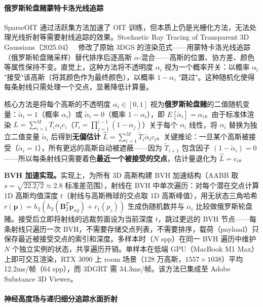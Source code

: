 \paragraph{俄罗斯轮盘赌蒙特卡洛光线追踪}

SparseOIT 通过活跃集方法加速了 OIT 训练，但本质上仍是光栅化方法，无法处理光线折射等需要射线追踪的效果。Stochastic Ray Tracing of Transparent 3D Gaussians（2025.04）~\cite{2504_06598} 修改了原始 3DGS 的渲染范式——用蒙特卡洛光线追踪（俄罗斯轮盘赌采样）替代排序后逐高斯 $\alpha$-混合——高斯的位置、协方差、颜色等属性保持不变。直觉上，这种方法将不透明度 $\alpha_i$ 视为一个概率开关：以概率 $\alpha_i$ "接受"该高斯（将其颜色作为最终颜色），以概率 $1-\alpha_i$ "跳过"。这种随机化使得每条射线只需处理一个交点，显著降低计算量。

核心方法是将每个高斯的不透明度 $\alpha_i \in [0,1]$ 视为\textbf{俄罗斯轮盘赌}的二值随机变量：$\tilde{\alpha}_i = 1$（概率 $\alpha_i$）或 $\tilde{\alpha}_i = 0$（概率 $1-\alpha_i$），即 $E[\tilde{\alpha}_i] = \alpha_i$。由于标准体渲染 $L = \sum_{i=1}^M T_i \alpha_i c_i$（$T_i = \prod_{j=1}^{i-1}(1-\alpha_j)$）关于每个 $\alpha_i$ 线性，将 $\alpha_i$ 替换为独立二值变量 $\tilde{\alpha}_i$ 后得到\textbf{无偏估计} $\hat{L} = \sum_{i=1}^M \tilde{T}_i \tilde{\alpha}_i c_i$。关键推论：一旦某个高斯被接受（$\tilde{\alpha}_i=1$），所有更远的高斯自动被遮蔽——因为 $\tilde{T}_{i+1}$ 包含因子 $(1-\tilde{\alpha}_i)=0$——所以每条射线只需要着色\textbf{最近一个被接受的交点}，估计量退化为 $\hat{L} = c_i$。

\textbf{BVH 加速实现。}实现上，为所有 3D 高斯构建 BVH 加速结构（AABB 取 $s = \sqrt{22.2/2} \approx 2.8$ 标准差范围），射线在 BVH 中单次遍历：对每个潜在交点计算 1D 高斯均值深度 $t$（射线与高斯椭球的交点取 1D 高斯峰值），用无状态三角哈希 $r(\mathbf{p}) = h_2(h_2(\mathbf{B}_2^T\mathbf{p}_{xy}) + r_1(p_z))$ 生成伪随机数并与 $\alpha_i$ 比较做俄罗斯轮盘赌。接受后立即将射线的远裁剪面设为当前深度 $t$，跳过更远的 BVH 节点——每条射线只遍历一次 BVH，不需要存储交点列表，不需要排序，载荷（payload）只保存最近被接受交点的索引和深度。多样本时（$N$ spp）在同一 BVH 遍历中维护 $N$ 个独立实例的状态，共享遍历开销。单样本在低端 GPU（MacBook M1 Max）上即可交互渲染，RTX 3090 上 room 场景（128 万高斯，$1557{\times}1038$）平均 12.2ms/帧（64 spp），而 3DGRT 需 34.3ms/帧。该方法已集成至 Adobe Substance 3D Viewer。

\paragraph{神经高度场与递归细分追踪水面折射}

